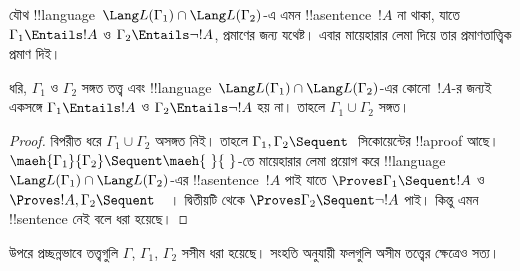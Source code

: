 \documentclass[../../../include/open-logic-section]{subfiles}
\begin{document}
যৌথ !!{language}~$\Lang L(\Gamma_1) \cap \Lang L(\Gamma_2)$-এ
এমন !!a{sentence}~$!A$ না থাকা, যাতে
$\Gamma_1 \Entails !A$ ও $\Gamma_2 \Entails \lnot !A$,
প্রমাণের জন্য যথেষ্ট। এবার মায়েহারার লেমা দিয়ে তার
প্রমাণতাত্ত্বিক প্রমাণ দিই।

\begin{thm}
ধরি, $\Gamma_1$ ও $\Gamma_2$ সঙ্গত তত্ত্ব এবং
!!{language}~$\Lang L(\Gamma_1) \cap \Lang L(\Gamma_2)$-এর
কোনো~$!A$-র জন্যই একসঙ্গে
$\Gamma_1 \Entails !A$ ও $\Gamma_2 \Entails \lnot !A$
হয় না। তাহলে $\Gamma_1 \cup \Gamma_2$ সঙ্গত।
\end{thm}

\begin{proof}
  বিপরীত ধরে $\Gamma_1 \cup \Gamma_2$ অসঙ্গত নিই। তাহলে
  $\Gamma_1, \Gamma_2 \Sequent \ $ সিকোয়েন্টের !!a{proof}
  আছে। $\maeh{\Gamma_1}{\Gamma_2}
  \Sequent \maeh{\ }{\ }$-তে মায়েহারার লেমা প্রয়োগ করে
  !!{language}~$\Lang L(\Gamma_1) \cap \Lang L(\Gamma_2)$-এর
  !!a{sentence}~$!A$ পাই যাতে
  $\Proves \Gamma_1 \Sequent !A$ ও
  $\Proves !A, \Gamma_2 \Sequent \quad$। দ্বিতীয়টি থেকে
  $\Proves \Gamma_2 \Sequent \lnot !A$ পাই। কিন্তু এমন
  !!{sentence} নেই বলে ধরা হয়েছে।
\end{proof}

উপরে প্রচ্ছন্নভাবে তত্ত্বগুলি $\Gamma$, $\Gamma_1$,
$\Gamma_2$ সসীম ধরা হয়েছে। সংহতি অনুযায়ী ফলগুলি
অসীম তত্ত্বের ক্ষেত্রেও সত্য।
\end{document}
